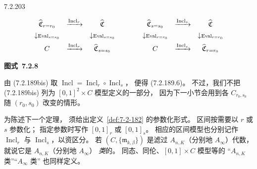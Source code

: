 \begin{remark}{7.2.203}
\par\medskip\noindent\begin{minipage}{\textwidth}
\centering
\[
\begin{array}{ccc@{\qquad\qquad}ccc}
\widehat{\mathfrak C}_{r=r_0}&
\xrightarrow{\operatorname{Incl}_r}&
\widehat{\mathfrak C}&
\widehat{\mathfrak C}_{s=s_0}&
\xrightarrow{\operatorname{Incl}_s}&
\widehat{\mathfrak C}\\[1ex]
\downarrow\scriptstyle\operatorname{Eval}_{s=s_0}&&
\downarrow\scriptstyle\operatorname{Eval}_{s=s_0}&
\downarrow\scriptstyle\operatorname{Eval}_{r=r_0}&&
\downarrow\scriptstyle\operatorname{Eval}_{r=r_0}\\[1ex]
C&\xrightarrow{\operatorname{Incl}_r}&
\widehat{\mathfrak C}_{s=s_0}&
C&\xrightarrow{\operatorname{Incl}_s}&
\widehat{\mathfrak C}_{r=r_0}
\end{array}
\]
\par{\renewcommand{\thefigure}{7.2.8}
\normalfont\bfseries 图式~\thefigure\label{diag:7-2-8}}
\end{minipage}\par\medskip

由 (7.2.189bis) 取
$\operatorname{Incl}
=\operatorname{Incl}_r\circ\operatorname{Incl}_s$，
便得 (7.2.189.6)。
不过，我们不把 (7.2.189bis)
列为 $[0,1]^2\times C$ 模型定义的一部分，
因为下一小节会用到各
$C_{r_0,s_0}$ 随 $(r_0,s_0)$ 改变的情形。
\end{remark}

为陈述下一个定理，
须给出定义~\ref{def:7-2-182}
的参数化形式。
区间按需要以 $r$ 或 $s$ 参数化；
指定参数时写作 $[0,1]_r$ 或 $[0,1]_s$。
相应的区间模型也分别记作
$\operatorname{Incl}_r$ 与
$\operatorname{Incl}_s$，以资区分。
若 $(C,\{\mathfrak m_{k,\beta}\})$
是滤过 $A_{n,K}$（分别地 $A_\infty$）代数，
就说它是 $A_{n,K}$（分别地 $A_\infty$）
\emph{类}的。
同态、同伦、$[0,1]\times C$ 模型等的
“$A_{n,K}$ 类”“$A_\infty$ 类”
也同样定义。
